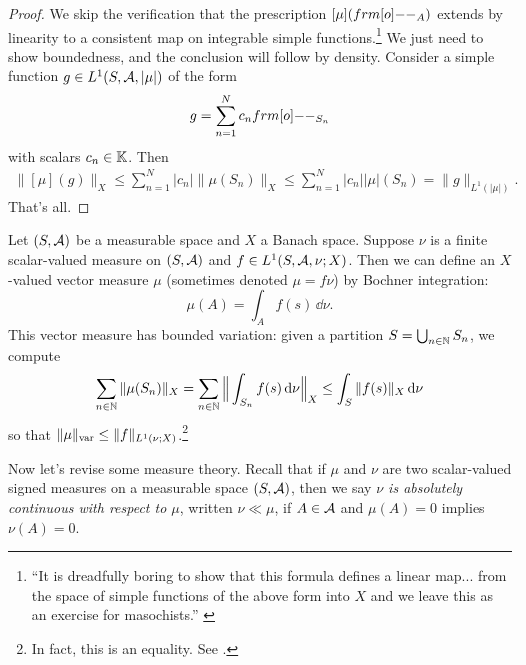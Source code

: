 \begin{proof}
  We skip the verification that the prescription $[\mu](\1_{A})$ extends by linearity to a consistent map on integrable simple functions.\footnote{``It is dreadfully boring to show that this formula defines a linear map... from the space of simple functions of the above form into $X$ and we leave this as an exercise for masochists.'' \cite[pp5-6]{DU77}}
  We just need to show boundedness, and the conclusion will follow by density.
  Consider a simple function $g \in L^1(S,\mathcal{A},|\mu|)$ of the form
  \begin{equation*}
    g = \sum_{n=1}^{N} c_n \1_{S_n} 
  \end{equation*}
  with scalars $c_n \in \mathbb{K}$.
  Then
  \begin{equation*}
    \begin{aligned}
      \|[\mu](g)\|_X \leq \sum_{n=1}^{N} |c_n| \|\mu(S_n)\|_X \leq \sum_{n=1}^{N} |c_n| |\mu|(S_n) = \|g\|_{L^1(|\mu|)}.
    \end{aligned}
  \end{equation*}
  That's all.
\end{proof}


\begin{example}\label{eg:RN-density}
  Let $(S,\mathcal{A})$ be a measurable space and $X$ a Banach space.
  Suppose $\nu$ is a finite scalar-valued measure on $(S,\mathcal{A})$ and $f \in L^1(S,\mathcal{A},\nu;X)$.
  Then we can define an $X$-valued vector measure $\mu$ (sometimes denoted $\mu = f\nu$) by Bochner integration:
  \begin{equation*}
    \mu(A) = \int_A f(s) \, \dd\nu.
  \end{equation*}
  This vector measure has bounded variation: given a partition $S = \bigcup_{n \in \mathbb{N}} S_n$, we compute
  \begin{equation*}
    \sum_{n \in \mathbb{N}} \|\mu(S_n)\|_{X} = \sum_{n \in \mathbb{N}} \Big\| \int_{S_n} f(s) \, \mathrm{d}\nu \Big\|_X
    \leq \int_{S} \|f(s)\|_{X} \, \mathrm{d}\nu
  \end{equation*}
  so that $\|\mu\|_{\mathrm{var}} \leq \|f\|_{L^1(\nu;X)}$.\footnote{In fact, this is an equality. See \cite[pp43]{gP16}.}
\end{example}

Now let's revise some measure theory.
Recall that if $\mu$ and $\nu$ are two scalar-valued signed measures on a measurable space $(S,\mathcal{A})$, then we say \emph{$\nu$ is absolutely continuous with respect to $\mu$}, written $\nu \ll \mu$, if $A \in \mathcal{A}$ and $\mu(A) = 0$ implies $\nu(A) = 0$.

